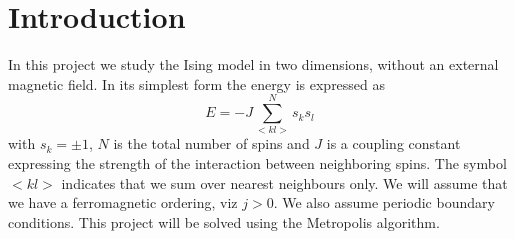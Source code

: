 \documentclass{aa}   %
\begin{document}
  


\section{Introduction}\label{sec:introduction}
In this project we study the Ising model in two dimensions, without an external magnetic field. 
In its simplest form the energy is expressed  as 
\begin{equation}
 E = -J\sum_{<kl>}^N s_ks_l
\end{equation}
with $s_k = \pm 1$, $N$ is the total number of spins and $J$ is a coupling constant expressing the strength of the interaction between neighboring spins. The symbol $<kl>$ indicates that we sum over nearest neighbours only. We will assume that we have a ferromagnetic ordering, viz $j > 0$. We also assume periodic boundary conditions. This project will be solved using the Metropolis algorithm.
\end{document}
